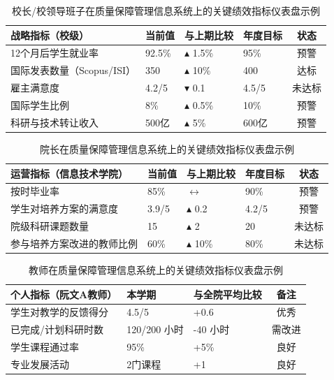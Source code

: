 \begin{table}[h!]
\centering
\caption{校长/校领导班子在质量保障管理信息系统上的关键绩效指标仪表盘示例}
\label{tab:dashboard_hieu_truong}
\begin{tabular}{|p{4.5cm}|p{2.5cm}|p{2.5cm}|p{2cm}|c|}
\hline
\textbf{战略指标（校级）} & \textbf{当前值} & \textbf{与上期比较} & \textbf{年度目标} & \textbf{状态} \\
\hline
12个月后学生就业率 & 92.5\% & $\blacktriangle$ 1.5\% & 95\% & 预警 \\
\hline
国际发表数量（Scopus/ISI） & 350 & $\blacktriangle$ 10\% & 400 & 达标 \\
\hline
雇主满意度 & 4.2/5 & $\blacktriangledown$ 0.1 & 4.5/5 & 未达标 \\
\hline
国际学生比例 & 8\% & $\blacktriangle$ 0.5\% & 10\% & 预警 \\
\hline
科研与技术转让收入 & 500亿 & $\blacktriangle$ 5\% & 600亿 & 预警 \\
\hline
\end{tabular}
\end{table}

\begin{table}[h!]
\centering
\caption{院长在质量保障管理信息系统上的关键绩效指标仪表盘示例}
\label{tab:dashboard_truong_khoa}
\begin{tabular}{|p{5cm}|p{2.5cm}|p{2.5cm}|p{2cm}|c|}
\hline
\textbf{运营指标（信息技术学院）} & \textbf{当前值} & \textbf{与上期比较} & \textbf{年度目标} & \textbf{状态} \\
\hline
按时毕业率 & 85\% & $\longleftrightarrow$ & 90\% & 预警 \\
\hline
学生对培养方案的满意度 & 3.9/5 & $\blacktriangle$ 0.2 & 4.2/5 & 预警 \\
\hline
院级科研课题数量 & 15 & $\blacktriangle$ 2 & 20 & 未达标 \\
\hline
参与培养方案改进的教师比例 & 60\% & $\blacktriangle$ 10\% & 80\% & 未达标 \\
\hline
\end{tabular}
\end{table}

\begin{table}[h!]
\centering
\caption{教师在质量保障管理信息系统上的关键绩效指标仪表盘示例}
\label{tab:dashboard_giang_vien}
\begin{tabular}{|p{5.5cm}|p{2.5cm}|p{3.5cm}|c|}
\hline
\textbf{个人指标（阮文A教师）} & \textbf{本学期} & \textbf{与全院平均比较} & \textbf{备注} \\
\hline
学生对教学的反馈得分 & 4.5/5 & +0.6 & 优秀 \\
\hline
已完成/计划科研时数 & 120/200 小时 & -40 小时 & 需改进 \\
\hline
学生课程通过率 & 95\% & +5\% & 良好 \\
\hline
专业发展活动 & 2门课程 & +1 & 良好 \\
\hline
\end{tabular}
\end{table}
    

